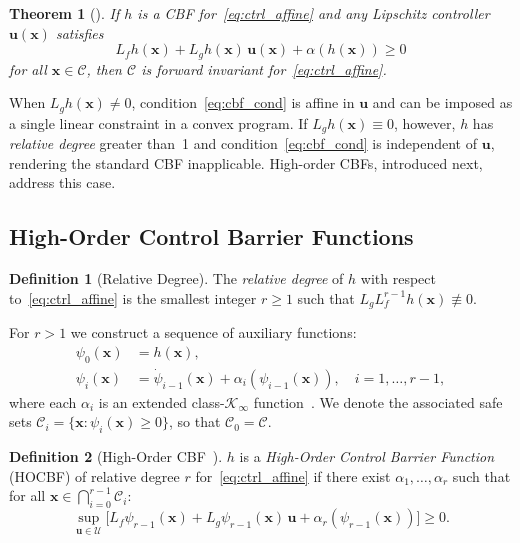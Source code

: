 \documentclass[lettersize,journal]{IEEEtran}
\newtheorem{theorem}{Theorem}
\theoremstyle{definition}
\newtheorem{definition}{Definition}
\theoremstyle{remark}
\newcommand{\vect}[1]{\bm{#1}}
\begin{document}
\begin{theorem}[\cite{ames2019control}]
If $h$ is a CBF for~\eqref{eq:ctrl_affine} and any Lipschitz
controller $\vect{u}(\vect{x})$ satisfies
\begin{equation}
    L_f h(\vect{x}) + L_g h(\vect{x})\,\vect{u}(\vect{x})
        + \alpha(h(\vect{x})) \geq 0
    \label{eq:cbf_cond}
\end{equation}
for all $\vect{x}\in\mathcal{C}$, then $\mathcal{C}$ is forward
invariant for~\eqref{eq:ctrl_affine}.
\end{theorem}

When $L_g h(\vect{x}) \neq 0$, condition~\eqref{eq:cbf_cond} is
affine in $\vect{u}$ and can be imposed as a single linear
constraint in a convex program.
If $L_g h(\vect{x}) \equiv 0$, however, $h$ has
\emph{relative degree} greater than~1 and
condition~\eqref{eq:cbf_cond} is independent of $\vect{u}$,
rendering the standard CBF inapplicable.
High-order CBFs, introduced next, address this case.

\subsection{High-Order Control Barrier Functions}
\label{sec:hocbf}

\begin{definition}[Relative Degree]
The \emph{relative degree} of $h$ with respect to~\eqref{eq:ctrl_affine}
is the smallest integer $r \geq 1$ such that
$L_g L_f^{r-1} h(\vect{x}) \not\equiv 0$.
\end{definition}

For $r > 1$ we construct a sequence of auxiliary functions:
\begin{equation}
\begin{aligned}
    \psi_0(\vect{x}) &= h(\vect{x}), \\
    \psi_i(\vect{x}) &= \dot{\psi}_{i-1}(\vect{x})
                        + \alpha_i\!\left(\psi_{i-1}(\vect{x})\right),
    \quad i = 1,\ldots,r-1,
\end{aligned}
\label{eq:hocbf_seq}
\end{equation}
where each $\alpha_i$ is an extended class-$\mathcal{K}_\infty$
function~\cite{xiao2021high}.
We denote the associated safe sets
$\mathcal{C}_i = \{\vect{x}: \psi_i(\vect{x})\geq 0\}$, so that
$\mathcal{C}_0 = \mathcal{C}$.

\begin{definition}[High-Order CBF~\cite{xiao2021high}]
$h$ is a \emph{High-Order Control Barrier Function} (HOCBF) of
relative degree $r$ for~\eqref{eq:ctrl_affine} if there exist
$\alpha_1,\ldots,\alpha_r$ such that for all
$\vect{x}\in\bigcap_{i=0}^{r-1}\mathcal{C}_i$:
\begin{equation}
    \sup_{\vect{u}\in\mathcal{U}}\bigl[
        L_f \psi_{r-1}(\vect{x})
        + L_g \psi_{r-1}(\vect{x})\,\vect{u}
        + \alpha_r(\psi_{r-1}(\vect{x}))
    \bigr] \geq 0.
    \label{eq:hocbf_def}
\end{equation}
\end{definition}
\end{document}
